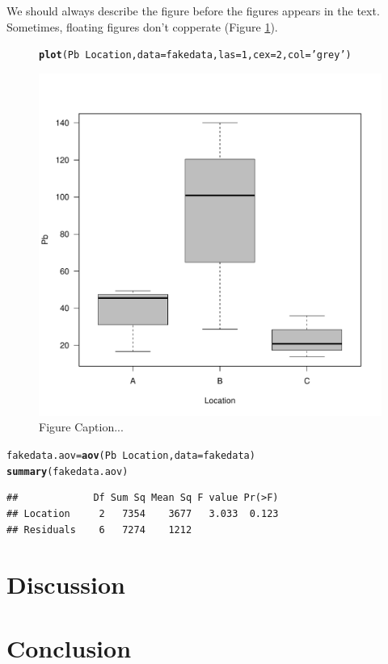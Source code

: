 \documentclass{article}\usepackage[]{graphicx}\usepackage[]{color}
\makeatletter
\def\maxwidth{ %
  \ifdim\Gin@nat@width>\linewidth
    \linewidth
  \else
    \Gin@nat@width
  \fi
}
\newcommand{\hlnum}[1]{\textcolor[rgb]{0.686,0.059,0.569}{#1}}%
\newcommand{\hlstr}[1]{\textcolor[rgb]{0.192,0.494,0.8}{#1}}%
\newcommand{\hlopt}[1]{\textcolor[rgb]{0,0,0}{#1}}%
\newcommand{\hlstd}[1]{\textcolor[rgb]{0.345,0.345,0.345}{#1}}%
\newcommand{\hlkwb}[1]{\textcolor[rgb]{0.69,0.353,0.396}{#1}}%
\newcommand{\hlkwc}[1]{\textcolor[rgb]{0.333,0.667,0.333}{#1}}%
\newcommand{\hlkwd}[1]{\textcolor[rgb]{0.737,0.353,0.396}{\textbf{#1}}}%
\newenvironment{kframe}{%
 \def\at@end@of@kframe{}%
 \ifinner\ifhmode%
  \def\at@end@of@kframe{\end{minipage}}%
  \begin{minipage}{\columnwidth}%
 \fi\fi%
 \def\FrameCommand##1{\hskip\@totalleftmargin \hskip-\fboxsep
 \colorbox{shadecolor}{##1}\hskip-\fboxsep
     \hskip-\linewidth \hskip-\@totalleftmargin \hskip\columnwidth}%
 \MakeFramed {\advance\hsize-\width
   \@totalleftmargin\z@ \linewidth\hsize
   \@setminipage}}%
 {\par\unskip\endMakeFramed%
 \at@end@of@kframe}
\newenvironment{knitrout}{}{} %
\makeatother
\begin{document}
We should always describe the figure before the figures appears in the text. Sometimes, floating figures don't copperate (Figure \ref{fig.boxplot}).


\begin{figure}
\begin{knitrout}
\color{fgcolor}\begin{kframe}
\begin{alltt}
\hlkwd{plot}\hlstd{(Pb} \hlopt{~} \hlstd{Location,} \hlkwc{data}\hlstd{=fakedata,} \hlkwc{las}\hlstd{=}\hlnum{1}\hlstd{,} \hlkwc{cex}\hlstd{=}\hlnum{2}\hlstd{,} \hlkwc{col}\hlstd{=}\hlstr{'grey'}\hlstd{)}
\end{alltt}
\end{kframe}
\includegraphics[width=\maxwidth]{figure/boxplot-1} 

\end{knitrout}
\caption{Figure Caption...}
\label{fig.boxplot}
\end{figure}
\begin{knitrout}
\color{fgcolor}\begin{kframe}
\begin{alltt}
\hlstd{fakedata.aov} \hlkwb{=} \hlkwd{aov}\hlstd{(Pb} \hlopt{~} \hlstd{Location,} \hlkwc{data}\hlstd{=fakedata)}
\hlkwd{summary}\hlstd{(fakedata.aov)}
\end{alltt}
\begin{verbatim}
##             Df Sum Sq Mean Sq F value Pr(>F)
## Location     2   7354    3677   3.033  0.123
## Residuals    6   7274    1212
\end{verbatim}
\end{kframe}
\end{knitrout}
\section{Discussion}

\section{Conclusion}


\end{document}
